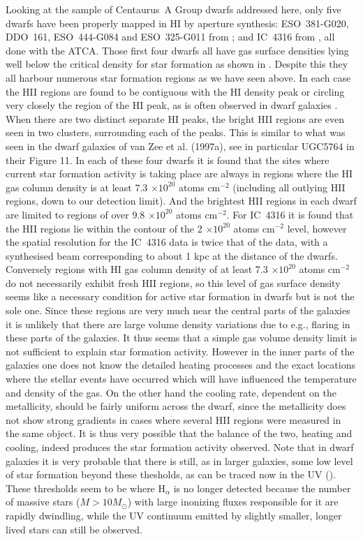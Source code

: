 \documentclass[preprint]{aastex}
\begin{document}
Looking at the sample of Centaurus~A Group dwarfs addressed here, only five
dwarfs have been properly mapped in HI by aperture synthesis:  
ESO~381-G020, DDO~161, ESO~444-G084 and ESO~325-G011 
from \citet{ccf00}; and IC~4316 from \citet{dzdbf02}, 
all done with the ATCA. Those first four dwarfs 
all have gas surface densities lying well below the critical density
for star formation \citep[calculated following][]{k89} as shown in 
\citet{ccf00}. Despite this they all harbour numerous star
formation regions as we have seen above. In each case the HII regions
are found to be contiguous with the HI density peak or circling very closely
the region of the HI peak, as is often observed in dwarf galaxies
\citep[e.g.,][]{s88, t94}. 
When there are two distinct separate HI peaks,
the bright HII regions are even seen in two clusters, surrounding each of the 
peaks. This is similar to what was seen in the dwarf galaxies of van Zee et al. (1997a),  
see in particular UGC5764 in their Figure 11. In each of these four dwarfs
it is found that the sites where current star formation activity is taking
place are always in regions where the HI gas column density is at least 
7.3 $\times 10^{20}$ atoms cm$^{-2}$ (including all outlying HII regions,
down to our detection limit). And the brightest HII regions in each dwarf 
are limited to
regions of over 9.8 $\times 10^{20}$ atoms cm$^{-2}$. For IC~4316 it is
found that the HII regions lie within the contour of the 2 $\times 10^{20}$ 
atoms cm$^{-2}$ level, however the spatial resolution for the IC~4316 data 
is twice that of the \citet{ccf00} data, with a synthesised beam
corresponding to about 1 kpc at the distance of the dwarfs. Conversely
regions with HI gas column density of at least 7.3 $\times 10^{20}$ 
atoms cm$^{-2}$ do not necessarily exhibit fresh HII regions, so this level
of gas surface density seems like a necessary condition for active star
formation in dwarfs but is not the sole one. Since these regions are very
much near the central parts of the galaxies it is unlikely that there are
large volume density variations due to e.g., flaring in these parts of
the galaxies. It thus seems that a simple gas volume density limit is not
sufficient to explain star formation activity. However in the inner parts
of the galaxies one does not know the detailed heating processes and the
exact locations where the stellar events have occurred which will have 
influenced the temperature and density of the gas. On the other hand the 
cooling rate, dependent on the metallicity, should be fairly uniform
across the dwarf, since the metallicity does not show strong gradients
in cases where several HII regions were measured in the same object. It is
thus very possible that the balance of the two, heating and cooling, indeed
produces the star formation activity observed. Note that in dwarf galaxies
it is very probable that there is still, as in larger galaxies, some low
level of star formation beyond these thesholds, as can be traced now in
the UV (\citep {boi07}). These thresholds seem to be where H$_\alpha$ 
is no longer detected because the number of massive stars ($M > 10 M_\odot$)
with large inonizing fluxes responsible for it are rapidly dwindling, while the
UV continuum emitted by slightly smaller, longer lived stars can still be
observed.
\end{document}
